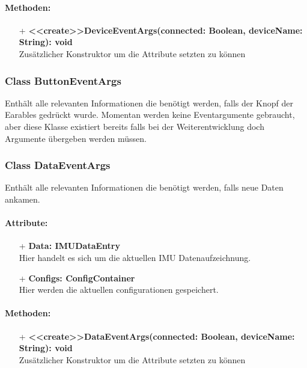 \documentclass[a4paper,12pt]{article}
\begin{document}
\paragraph{Methoden:}
\begin{itemize}
	\item[+] \textbf{<<create>>DeviceEventArgs(connected: Boolean, deviceName: String): void}\\Zusätzlicher Konstruktor um die Attribute setzten zu können
\end{itemize}


\subsubsection{Class ButtonEventArgs}
Enthält alle relevanten Informationen die benötigt werden, falls der Knopf der Earables gedrückt wurde. Momentan werden keine Eventargumente gebraucht, aber diese Klasse existiert bereits falls bei der Weiterentwicklung doch Argumente übergeben werden müssen.


\subsubsection{Class DataEventArgs}
Enthält alle relevanten Informationen die benötigt werden, falls neue Daten ankamen.

\paragraph{Attribute:}
\begin{itemize}
	\item[+] \textbf{Data: IMUDataEntry}\\Hier handelt es sich um die aktuellen IMU Datenaufzeichnung.
	\item[+] \textbf{Configs: ConfigContainer}\\Hier werden die aktuellen configurationen gespeichert.
\end{itemize}

\paragraph{Methoden:}
\begin{itemize}
	\item[+] \textbf{<<create>>DataEventArgs(connected: Boolean, deviceName: String): void}\\Zusätzlicher Konstruktor um die Attribute setzten zu können
\end{itemize}
\end{document}

